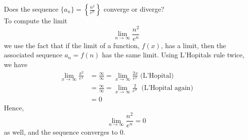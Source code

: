 \documentclass[handout]{ximera}
\begin{document}
\begin{example}
Does the sequence $\displaystyle \{a_n\} = \left\{\frac{n^2}{e^n}\right\}$ converge or diverge?\\
To compute the limit
\[
\lim_{n \to \infty} \frac{n^2}{e^n}
\]
we use the fact that if the limit of a function, $f(x)$, has a limit, then the associated sequence
$a_n = f(n)$ has the same limit. Using L'Hopitals rule twice, we have
\begin{align*}
\lim_{x \to \infty} \frac{x^2}{e^x} &= \frac{\infty}{\infty} = \lim_{x \to \infty} \frac{2x}{e^x} \;\text{(L'Hopital)}\\
                                  &=\frac{\infty}{\infty} = \lim_{x \to \infty} \frac{2}{e^x} \;\;\text{(L'Hopital again)}\\
                                  &=0
\end{align*}
Hence, 
\[
\lim_{n \to \infty} \frac{n^2}{e^n} =0
\]
as well, and the sequence converges to $0$. 
\end{example}
\end{document}
